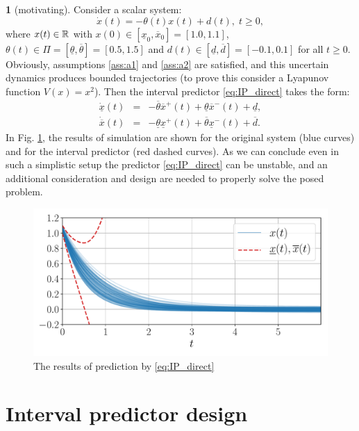 \documentclass[twocolumn,english]{IEEEtran}
\theoremstyle{plain}
\theoremstyle{definition}
\newtheorem*{example*}{\protect\examplename}
\theoremstyle{plain}
\theoremstyle{plain}
\theoremstyle{remark}
\providecommand{\examplename}{Example}
\begin{document}
\begin{example*}
[motivating] Consider a scalar system:
\[
\dot{x}(t)=-\theta(t)x(t)+d(t),\;t\geq0,
\]
where $x(t)\in\mathbb{R}$ with $x(0)\in[\underline{x}_{0},\overline{x}_{0}]=[1.0, 1.1]$, $\theta(t)\in\Pi=[\underline{\theta},\overline{\theta}]=[0.5,1.5]$ and $d(t)\in[\underline{d},\overline{d}]=[-0.1,0.1]$ for all $t\geq0$. Obviously, assumptions \ref{ass:a1} and \ref{ass:a2} are satisfied, and this uncertain dynamics produces bounded trajectories (to prove this consider a Lyapunov function $V(x)=x^{2}$). Then the interval predictor \eqref{eq:IP_direct} takes the form:
\begin{eqnarray*}
\dot{\underline{x}}(t) & = & -\overline{\theta}\overline{x}^{+}(t)+\underline{\theta}\overline{x}^{-}(t)+\underline{d},\\
\dot{\overline{x}}(t) & = & -\underline{\theta}\underline{x}^{+}(t)+\overline{\theta}\underline{x}^{-}(t)+\overline{d}.
\end{eqnarray*}
In Fig. \ref{fig:IP_Direct}, the results of simulation are shown for the original system (blue curves) and for the interval predictor (red dashed curves). As we can conclude even in such a simplistic setup the predictor \eqref{eq:IP_direct} can be unstable, and an additional consideration and design are needed to properly solve the posed problem. 
\begin{figure}
\begin{centering}
\includegraphics[width=\linewidth]{observer}
\par\end{centering}
\caption{\label{fig:IP_Direct} The results of prediction by \eqref{eq:IP_direct}}
\end{figure}
\end{example*}

\section{\label{sec:Main-results} Interval predictor design}
\end{document}
